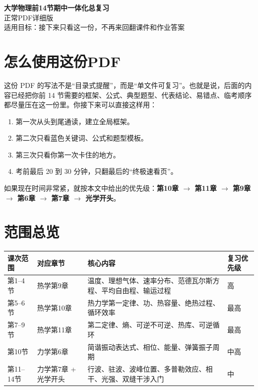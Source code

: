 \documentclass[12pt,a4paper]{article}
\newcommand{\key}[1]{\textcolor{blue!60!black}{\textbf{#1}}}
\begin{document}
\begin{center}
{\LARGE\bfseries 大学物理前14节期中一体化总复习}\\[8pt]
{\large 正常PDF详细版}\\[8pt]
{\normalsize 适用目标：接下来只看这一份，不再来回翻课件和作业答案}
\end{center}

\vspace{6mm}

\section*{怎么使用这份PDF}

这份 PDF 的写法不是“目录式提醒”，而是“单文件可复习”。也就是说，后面的内容已经把你前 14 节需要的框架、公式、典型题型、代表结论、易错点、临考顺序都尽量压在这一份里。你接下来可以直接这样用：

\begin{enumerate}
  \item 第一次从头到尾通读，建立全局框架。
  \item 第二次只看蓝色关键词、公式和题型模板。
  \item 第三次只看你第一次卡住的地方。
  \item 考前最后 20 到 30 分钟，只翻最后的“终极速看页”。
\end{enumerate}

如果现在时间非常紧，就按本文中给出的优先级：\key{第10章 $\rightarrow$ 第11章 $\rightarrow$ 第9章 $\rightarrow$ 第6章 $\rightarrow$ 第7章 $\rightarrow$ 光学开头}。

\section*{范围总览}

\begin{tabularx}{\textwidth}{>{\raggedright\arraybackslash}p{1.8cm} >{\raggedright\arraybackslash}p{3.0cm} X >{\raggedright\arraybackslash}p{2.2cm}}
\toprule
课次范围 & 对应章节 & 核心内容 & 复习优先级 \\
\midrule
第1--4节 & 热学第9章 & 温度、理想气体、速率分布、范德瓦尔斯方程、平均自由程、输运过程 & 高 \\
第5--6节 & 热学第10章 & 热力学第一定律、功、热容量、绝热过程、循环效率 & 最高 \\
第7--9节 & 热学第11章 & 第二定律、熵、可逆不可逆、热库、可逆循环 & 最高 \\
第10节 & 力学第6章 & 简谐振动表达式、相位、能量、弹簧振子周期 & 中高 \\
第11--14节 & 力学第7章 + 光学开头 & 行波、驻波、波峰位置、多普勒效应、相干、光强、双缝干涉入门 & 中 \\
\bottomrule
\end{tabularx}
\end{document}
